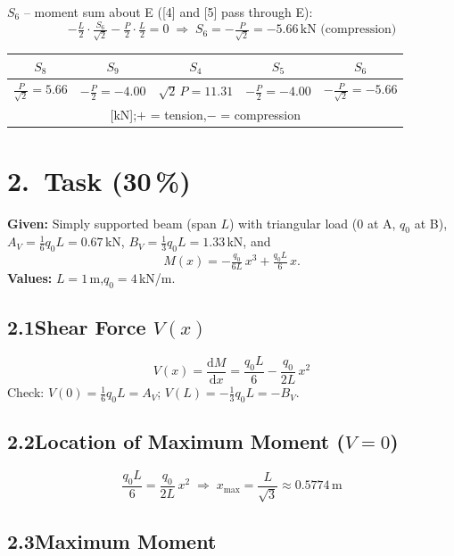 \documentclass[a4paper,11pt]{article}
\begin{document}
\textbf{$S_6$} -- moment sum about E ([4] and [5] pass through E):
\[
  -\tfrac{L}{2}\cdot\tfrac{S_6}{\sqrt{2}} - \tfrac{P}{2}\cdot\tfrac{L}{2} = 0
  \;\Rightarrow\; \boxed{S_6 = -\tfrac{P}{\sqrt{2}} = -5.66\,\text{kN (compression)}}
\]

\medskip
\begin{center}
\begin{tabular}{ccccc}
\toprule
$S_8$ & $S_9$ & $S_4$ & $S_5$ & $S_6$ \\
\midrule
$\tfrac{P}{\sqrt{2}} = 5.66$ & $-\tfrac{P}{2} = -4.00$ &
$\sqrt{2}\,P = 11.31$ & $-\tfrac{P}{2} = -4.00$ & $-\tfrac{P}{\sqrt{2}} = -5.66$ \\
\multicolumn{5}{c}{\small [kN];\quad $+$ = tension,\quad $-$ = compression} \\
\bottomrule
\end{tabular}
\end{center}

\newpage
\section*{2.~Task \hfill (30\,\%)}

\textbf{Given:} Simply supported beam (span $L$) with triangular load
(0 at A, $q_0$ at B),
$A_V = \tfrac{1}{6}q_0 L = 0.67$\,kN,
$B_V = \tfrac{1}{3}q_0 L = 1.33$\,kN, and
\[
  M(x) = -\tfrac{q_0}{6L}\,x^3 + \tfrac{q_0 L}{6}\,x.
\]
\textbf{Values:} $L = 1$\,m,\quad $q_0 = 4$\,kN/m.

\subsection*{2.1\quad Shear Force $V(x)$}

\[
  V(x) = \frac{\mathrm{d}M}{\mathrm{d}x}
        = \frac{q_0 L}{6} - \frac{q_0}{2L}\,x^2
\]
Check: $V(0) = \tfrac{1}{6}q_0 L = A_V$\;\checkmark;\quad
$V(L) = -\tfrac{1}{3}q_0 L = -B_V$\;\checkmark.

\subsection*{2.2\quad Location of Maximum Moment ($V = 0$)}

\[
  \frac{q_0 L}{6} = \frac{q_0}{2L}\,x^2
  \;\Rightarrow\; \boxed{x_{\max} = \frac{L}{\sqrt{3}} \approx 0.5774\,\text{m}}
\]

\subsection*{2.3\quad Maximum Moment}
\end{document}
